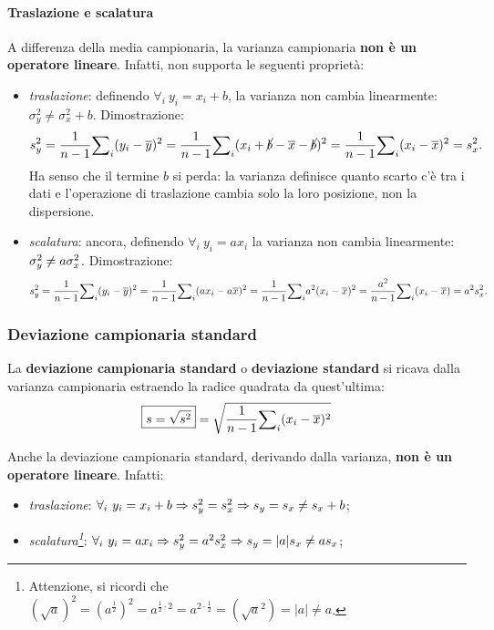 \paragraph{Traslazione e scalatura} A differenza della media campionaria, la varianza campionaria \textbf{non è un operatore lineare}. Infatti, non supporta le seguenti proprietà:
\begin{itemize}
    \item \textit{traslazione}: definendo $\forall_i \ y_i = x_i + b$, la varianza non cambia linearmente: $\sigma^2_y \neq \sigma^2_x + b$. Dimostrazione: 
    \[
    \mathnormal{s}^2_y = \frac{1}{n - 1}{\sum}_i{(y_i - \overline{y})^2} = \frac{1}{n - 1}{\sum}_i{(x_i + \cancel b - \overline{x} - \cancel b)^2} = \frac{1}{n - 1}{\sum}_i{(x_i - \overline{x})^2} = \mathnormal{s}_x^2.
    \]
    Ha senso che il termine $b$ si perda: la varianza definisce quanto scarto c'è tra i dati e l'operazione di traslazione cambia solo la loro posizione, non la dispersione.
    \item \textit{scalatura}: ancora, definendo $\forall_i \ y_i = a x_i$ la varianza non cambia linearmente: $\sigma^2_y \neq a \sigma^2_x$. Dimostrazione:
    \[ 
    \mathnormal{s}^2_y = \frac{1}{n - 1}{\sum}_i{(y_i - \overline{y})^2} = \frac{1}{n - 1}{\sum}_i{(a x_i - a\overline{x})^2} = \frac{1}{n - 1}{\sum}_i{a^2(x_i - \overline{x})^2} = \frac{a^2}{n - 1}{\sum}_i{(x_i - \overline{x})} = a^2\mathnormal{s}^2_x.
    \]
\end{itemize}

\subsubsection{Deviazione campionaria standard}
La \textbf{deviazione campionaria standard} o \textbf{deviazione standard} si ricava dalla varianza campionaria estraendo la radice quadrata da quest'ultima:
\[
\boxed{
    \mathnormal{s} = \sqrt{\mathnormal{s}^2}} = \sqrt{ \frac{1}{n-1}
    {\sum}_i{(x_i - \overline{x})^2}}
\]

\noindent Anche la deviazione campionaria standard, derivando dalla varianza, \textbf{non è un operatore lineare}. Infatti:
\begin{itemize}
    \item \textit{traslazione}: $\forall_i \ y_i = x_i + b \Rightarrow \mathnormal{s}^2_y = \mathnormal{s}^2_x \Rightarrow \mathnormal{s}_y = \mathnormal{s}_x \neq \mathnormal{s}_x + b$;
    \item \textit{scalatura\footnote{Attenzione, si ricordi che $(\sqrt a)^2 = (a^\frac{1}{2})^2 = a^{\frac{1}{2}\cdot2} = a^{2\cdot\frac{1}{2}} = (\sqrt a^2) = |a| \neq a$.}}: $\forall_i \ y_i = a x_i \Rightarrow \mathnormal{s}^2_y = a^2 \mathnormal{s}^2_x \Rightarrow \mathnormal{s}_y = |a| \mathnormal{s}_x \neq a \mathnormal{s}_x$;
\end{itemize}

